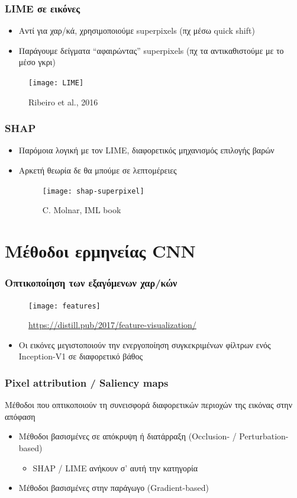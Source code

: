 \begin{frame}
  \frametitle{LIME σε εικόνες}
  \begin{itemize}
  \item Αντί για χαρ/κά, χρησιμοποιούμε superpixels (πχ μέσω quick shift)
  \item Παράγουμε δείγματα ``αφαιρώντας'' superpixels (πχ τα αντικαθιστούμε με το
    μέσο γκρι)
  \end{itemize}
  \begin{figure}
    \texttt{[image: LIME]}
    \caption{\footnotesize Ribeiro et al., 2016}
  \end{figure}
\end{frame}

\begin{frame}
  \frametitle{SHAP}
  \begin{itemize}
  \item Παρόμοια λογική με τον LIME, διαφορετικός μηχανισμός επιλογής βαρών
  \item Αρκετή θεωρία δε θα μπούμε σε λεπτομέρειες
    \begin{figure}
      \texttt{[image: shap-superpixel]}
      \caption{\footnotesize C. Molnar, IML book}
    \end{figure}
  \end{itemize}
\end{frame}

\section{Μέθοδοι ερμηνείας CNN}

\begin{frame}
  \frametitle{Οπτικοποίηση των εξαγόμενων χαρ/κών}
  \begin{figure}
    \texttt{[image: features]}
    \caption{\footnotesize \url{https://distill.pub/2017/feature-visualization/}}
  \end{figure}
  \begin{itemize}
  \item Οι εικόνες μεγιστοποιούν την ενεργοποίηση συγκεκριμένων φίλτρων ενός Inception-V1 σε
    διαφορετικό βάθος
  \end{itemize}
\end{frame}

\begin{frame}
  \frametitle{Pixel attribution / Saliency maps}
  Μέθοδοι που οπτικοποιούν τη συνεισφορά διαφορετικών περιοχών της εικόνας στην απόφαση
  \begin{itemize}
  \item Μέθοδοι βασισμένες σε απόκρυψη ή διατάρραξη (Occlusion- / Perturbation-based)
    \begin{itemize}
    \item SHAP / LIME ανήκουν σ' αυτή την κατηγορία
    \end{itemize}
  \item Μέθοδοι βασισμένες στην παράγωγο (Gradient-based)
  \end{itemize}
\end{frame}

